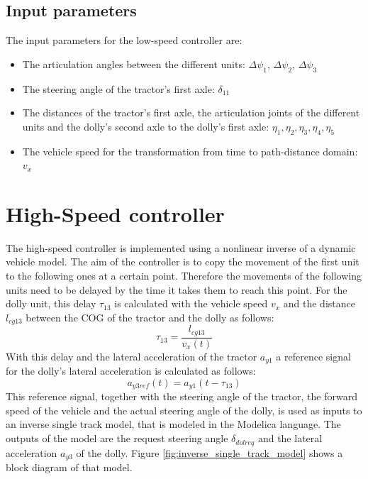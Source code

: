 \documentclass[ExampleMasters.tex]{subfiles}
\begin{document}
\subsection{Input parameters}
\label{sec:input_parameters_LS}
The input parameters for the low-speed controller are:
\begin{itemize}
	\item The articulation angles between the different units: $\Delta\psi_1$, $\Delta\psi_2$, $\Delta\psi_3$
	\item The steering angle of the tractor's first axle: $\delta_{11}$
	\item The distances of the tractor's first axle, the articulation joints of the different units and the dolly's second axle to the dolly's first axle: $\eta_1,\eta_2,\eta_3,\eta_4,\eta_5$
	\item The vehicle speed for the transformation from time to path-distance domain:  $v_x$
	
\end{itemize}

\section[High-Speed controller]{High-Speed controller \cite{High-speed_paper}}
\label{sec:high-speed_controller}
The high-speed controller is implemented using a nonlinear inverse of a dynamic vehicle model.
The aim of the controller is to copy the movement of the first unit to the following ones at a certain point. Therefore the movements of the following units need to be delayed by the time it takes them to reach this point. For the dolly unit, this delay $\tau_{13}$ is calculated with the vehicle speed $v_x$ and the distance $l_{cg13}$ between the \gls{COG}  of the tractor and the dolly as follows:
\begin{equation}
\tau_{13}=\frac{l_{cg13}}{v_x(t)}
\end{equation}
With this delay and the lateral acceleration of the tractor $a_{y1}$ a reference signal for the dolly's lateral acceleration is calculated as follows:
\begin{equation}
a_{y3ref}(t)=a_{y1}(t-\tau_{13})
\end{equation}
This reference signal, together with the steering angle of the tractor, the forward speed of the vehicle and the actual steering angle of the dolly, is used as inputs to an inverse single track model, that is modeled in the Modelica language. The outputs of the model are the request steering angle $\delta_{dolreq}$ and the lateral acceleration $a_{y3}$ of the dolly. Figure \ref{fig:inverse_single_track_model} shows a block diagram of that model.  
\end{document}
